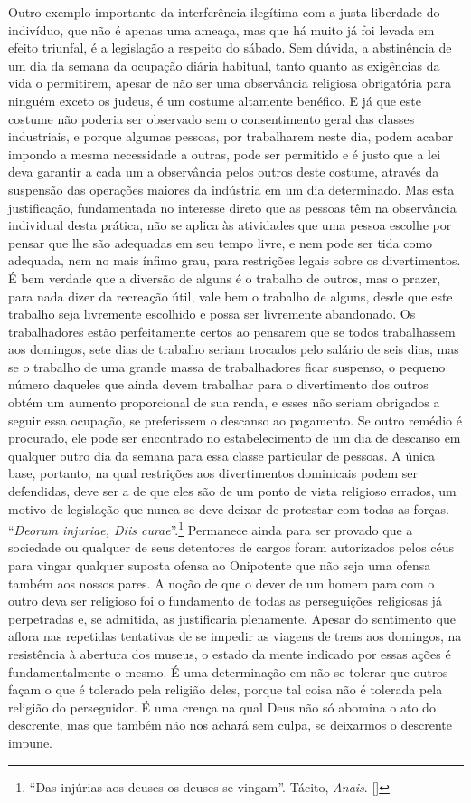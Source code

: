 Outro exemplo importante da interferência ilegítima com a justa
liberdade do indivíduo, que não é apenas uma ameaça, mas que há muito
já foi levada em efeito triunfal, é a legislação a respeito do sábado.
Sem dúvida, a abstinência de um dia da semana da ocupação diária
habitual, tanto quanto as exigências da vida o permitirem, apesar de
não ser uma observância religiosa obrigatória para ninguém exceto os
judeus, é um costume altamente benéfico. E já que este costume não
poderia ser observado sem o consentimento geral das classes
industriais, e porque algumas pessoas, por trabalharem neste dia, podem
acabar impondo a mesma necessidade a outras, pode ser permitido e é
justo que a lei deva garantir a cada um a observância pelos outros
deste costume, através da suspensão das operações maiores da indústria
em um dia determinado. Mas esta justificação, fundamentada no interesse
direto que as pessoas têm na observância individual desta prática, não
se aplica às atividades que uma pessoa escolhe por pensar que lhe são
adequadas em seu tempo livre, e nem pode ser tida como adequada, nem no
mais ínfimo grau, para restrições legais sobre os divertimentos. É bem
verdade que a diversão de alguns é o trabalho de outros, mas o prazer,
para nada dizer da recreação útil, vale bem o trabalho de alguns, desde
que este trabalho seja livremente escolhido e possa ser livremente
abandonado. Os trabalhadores estão perfeitamente certos ao pensarem que
se todos trabalhassem aos domingos, sete dias de trabalho seriam
trocados pelo salário de seis dias, mas se o trabalho de uma grande massa de
trabalhadores ficar suspenso, o pequeno número daqueles que
ainda devem trabalhar para o divertimento dos outros obtém um aumento
proporcional de sua renda, e esses não seriam obrigados a seguir essa
ocupação, se preferissem o descanso ao pagamento. Se outro remédio é
procurado, ele pode ser encontrado no estabelecimento de um dia de
descanso em qualquer outro dia da semana para essa classe particular de
pessoas. A única base, portanto, na qual restrições aos divertimentos
dominicais podem ser defendidas, deve ser a de que eles são de um ponto
de vista religioso errados, um motivo de legislação que nunca se deve
deixar de protestar com todas as forças. ``\textit{Deorum injuriae, Diis
curae}''.\footnote{ ``Das injúrias aos deuses os deuses 
se vingam''. Tácito, \textit{Anais}. []}
 Permanece ainda para ser provado que a sociedade ou qualquer de seus
detentores de cargos foram autorizados pelos céus para vingar
qualquer suposta ofensa ao Onipotente que não seja uma ofensa também
aos nossos pares. A noção de que o dever de um homem para com o
outro deva ser religioso foi o fundamento de todas as perseguições
religiosas já perpetradas e, se admitida, as justificaria plenamente.
Apesar do sentimento que aflora nas repetidas tentativas de se impedir
as viagens de trens aos domingos, na resistência à abertura dos museus,
o estado da mente indicado por essas ações é fundamentalmente o mesmo.
É uma determinação em não se tolerar que outros façam o que é tolerado
pela religião deles, porque tal coisa não é tolerada pela religião do
perseguidor. É uma crença na qual Deus não só abomina o ato do descrente, 
mas que também não nos achará sem culpa, se deixarmos o descrente impune. 

